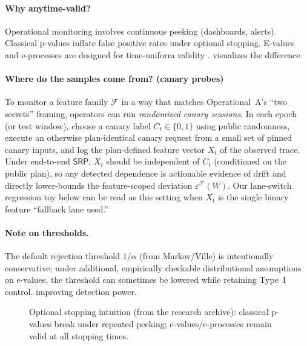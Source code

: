 \documentclass[11pt]{article}
\newcommand{\SRP}{\ensuremath{\mathsf{SRP}}}
\begin{document}
\paragraph{Why anytime-valid?}
Operational monitoring involves continuous peeking (dashboards, alerts).
Classical p-values inflate false positive rates under optional stopping.
E-values and e-processes are designed for time-uniform validity \cite{ramdasSAVIStatSci2023,shaferTestingByBetting,ramdasEvaluesEbook2025}.
 visualizes the difference.

\paragraph{Where do the samples come from? (canary probes)}
To monitor a feature family $\mathcal{F}$ in a way that matches Operational~A's ``two secrets'' framing, operators can run \emph{randomized canary sessions}.
In each epoch (or test window), choose a canary label $C_t\in\{0,1\}$ using public randomness, execute an otherwise plan-identical canary request from a small set of pinned canary inputs, and log the plan-defined feature vector $X_t$ of the observed trace.
Under end-to-end \SRP, $X_t$ should be independent of $C_t$ (conditioned on the public plan), so any detected dependence is actionable evidence of drift and directly lower-bounds the feature-scoped deviation $\varepsilon^{\mathcal{F}}(W)$.
Our lane-switch regression toy below can be read as this setting when $X_t$ is the single binary feature ``fallback lane used.''

\paragraph{Note on thresholds.}
The default rejection threshold $1/\alpha$ (from Markov/Ville) is intentionally conservative; under additional, empirically checkable distributional assumptions on e-values, the threshold can sometimes be lowered while retaining Type~I control, improving detection power.\cite{blierWongWangImprovedThresholds2026}

\begin{figure}[t]
  \centering
  \caption{Optional stopping intuition (from the research archive): classical p-values break under repeated peeking; e-values/e-processes remain valid at all stopping times.}
  \label{fig:optional}
\end{figure}
\end{document}
